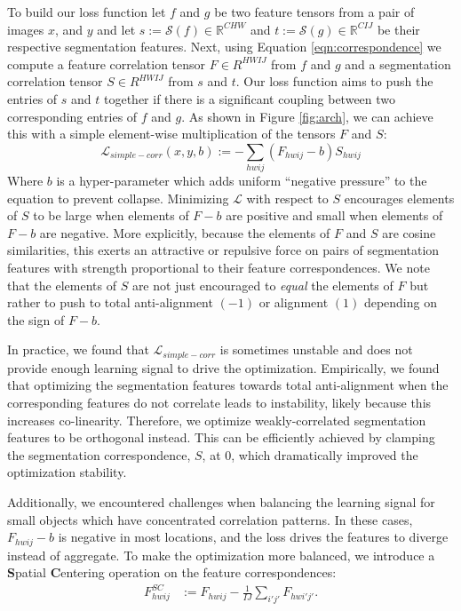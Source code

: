 \documentclass{article} \usepackage{iclr2022_conference,times}
\begin{document}
To build our loss function let $f$ and $g$ be two feature tensors from a pair of images $x$, and $y$ and let $s := \mathcal{S}(f) \in \mathbb{R}^{CHW}$ and $t := \mathcal{S}(g)  \in \mathbb{R}^{CIJ}$ be their respective segmentation features. Next, using Equation \ref{eqn:correspondence} we compute a feature correlation tensor $F \in R^{HWIJ}$ from $f$ and $g$ and a segmentation correlation tensor $S \in R^{HWIJ}$ from $s$ and $t$. Our loss function aims to push the entries of $s$ and $t$ together if there is a significant coupling between two corresponding entries of $f$ and $g$. As shown in Figure \ref{fig:arch}, we can achieve this with a simple element-wise multiplication of the tensors $F$ and $S$:
\begin{equation}
\label{eqn-simple_coor}
    \mathcal{L}_{\mathit{simple-corr}}(x,y,b) := - \sum_{hwij} (F_{hwij} - b) S_{hwij}
\end{equation}
Where $b$ is a hyper-parameter which adds uniform ``negative pressure'' to the equation to prevent collapse. Minimizing $\mathcal{L}$ with respect to $S$ encourages elements of $S$ to be large when elements of $F-b$ are positive and small when elements of $F-b$ are negative. More explicitly, because the elements of $F$ and $S$ are cosine similarities, this exerts an attractive or repulsive force on pairs of segmentation features with strength proportional to their feature correspondences. We note that the elements of $S$ are not just encouraged to \textit{equal} the elements of $F$ but rather to push to total anti-alignment $(-1)$ or alignment $(1)$ depending on the sign of $F-b$. 

In practice, we found that $\mathcal{L}_{\mathit{simple-corr}}$ is sometimes unstable and does not provide enough learning signal to drive the optimization. Empirically, we found that optimizing the segmentation features towards total anti-alignment when the corresponding features do not correlate leads to instability, likely because this increases co-linearity. Therefore, we optimize weakly-correlated segmentation features to be orthogonal instead. This can be efficiently achieved by clamping the segmentation correspondence, $S$, at $0$, which dramatically improved the optimization stability.

Additionally, we encountered challenges when balancing the learning signal for small objects which have concentrated correlation patterns. In these cases, $F_{hwij}-b$ is negative in most locations, and the loss drives the features to diverge instead of aggregate. To make the optimization more balanced, we introduce a \textbf{S}patial \textbf{C}entering operation on the feature correspondences:
\begin{align}
    F^{SC}_{hwij} &:= F_{hwij} - \frac{1}{IJ}\sum_{i'j'}F_{hwi'j'}.
\end{align}
\end{document}
